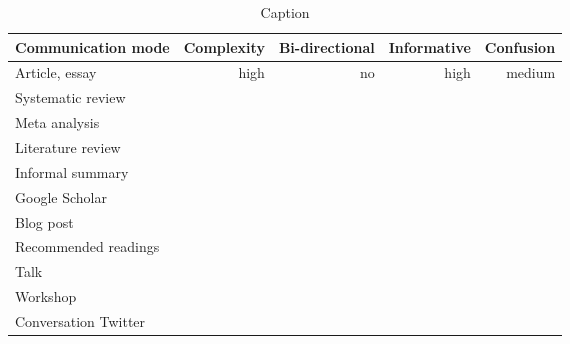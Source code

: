 \begin{table*}\centering
{}
\begin{tabular}{@{}lrrrr@{}}\toprule
Communication mode & Complexity & Bi-directional & Informative  & Confusion
\\\midrule
Article, essay & high & no & high & medium  \\
Systematic review \\
Meta analysis \\
Literature review \\
Informal summary \\
Google Scholar \\
Blog post \\
Recommended readings \\
Talk \\
Workshop \\
Conversation
Twitter


\bottomrule
\end{tabular}
\caption{Caption}
\end{table*}